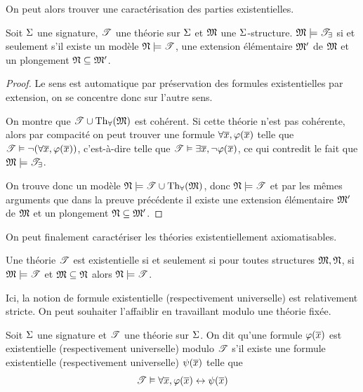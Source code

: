 \noindent
On peut alors trouver une caractérisation des parties existentielles.

\begin{proposition}
  Soit $\Sigma$ une signature, $\mathscr T$ une théorie sur $\Sigma$ et $\mathfrak{M}$ une
  $\Sigma$-structure. $\mathfrak{M}\models\mathscr T_{\exists}$ si et seulement s'il
  existe un modèle $\mathfrak{N}\models\mathscr T$, une extension élémentaire
  $\mathfrak{M}'$ de $\mathfrak{M}$ et un plongement $\mathfrak{N}\subseteq\mathfrak{M}'$.
\end{proposition}

\begin{proof}
  Le sens \fbox{$\Leftarrow$} est automatique par préservation des formules
  existentielles par extension, on se concentre donc sur l'autre sens.

  On montre que $\mathscr T\cup\operatorname{Th}_{\forall}(\mathfrak{M})$ est cohérent. Si cette théorie
  n'est pas cohérente, alors par compacité on peut trouver une formule
  $\forall \overline{x}, \varphi(\overline{x})$ telle que
  $\mathscr T\vDash\lnot(\forall \overline{x},\varphi(\overline{x}))$, c'est-à-dire telle que
  $\mathscr T\vDash\exists \overline{x}, \lnot\varphi(\overline{x})$, ce qui contredit le fait
  que $\mathfrak{M}\models\mathscr T_{\exists}$.

  On trouve donc un modèle $\mathfrak{N}\models\mathscr T\cup\operatorname{Th}_{\forall}(\mathfrak{M})$, donc
  $\mathfrak{N}\models\mathscr T$ et par les mêmes arguments que dans la preuve précédente
  il existe une extension élémentaire $\mathfrak{M}'$ de $\mathfrak{M}$ et un plongement
  $\mathfrak{N}\subseteq\mathfrak{M}'$.
\end{proof}

\noindent
On peut finalement caractériser les théories existentiellement axiomatisables.

\begin{corollary}
  Une théorie $\mathscr T$ est existentielle si et seulement si pour toutes
  structures $\mathfrak{M},\mathfrak{N}$, si $\mathfrak{M}\models\mathscr T$ et $\mathfrak{M}\subseteq\mathfrak{N}$
  alors $\mathfrak{N}\models\mathscr T$.
\end{corollary}

Ici, la notion de formule existentielle (respectivement universelle) est
relativement stricte. On peut souhaiter l'affaiblir en travaillant modulo une
théorie fixée.

\begin{definition}
  Soit $\Sigma$ une signature et $\mathscr T$ une théorie sur $\Sigma$. On dit qu'une
  formule $\varphi(\overline{x})$ est existentielle (respectivement universelle)
  modulo $\mathscr T$ s'il existe une formule existentielle (respectivement
  universelle) $\psi(\overline{x})$ telle que
  \[\mathscr T\vDash \forall \overline{x}, \varphi(\overline{x})\mathrel{\leftrightarrow} \psi(\overline{x})\]
\end{definition}

